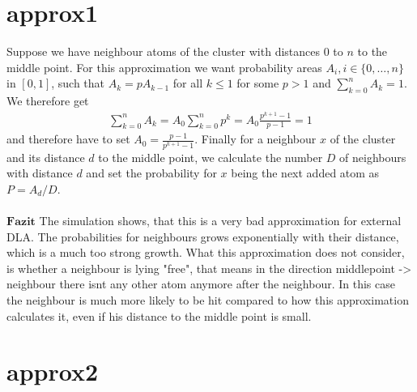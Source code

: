 \documentclass[12pt,a4paper]{scrartcl}
\begin{document}
	\pagestyle{empty}
	\theoremstyle{definition}
	\newtheorem{exmp}{Example}[section]
	\newtheorem{theorem}{Theorem}[section]
	\newtheorem{corollary}{Corollary}[theorem]
	\newtheorem{lemma}[theorem]{Lemma}
	\newtheorem{definition}[theorem]{Definition} 
	\newtheorem{proposition}[theorem]{Proposition}

\section{approx1}
Suppose we have neighbour atoms of the cluster with distances $0$ to $n$ to the middle point. For this approximation we want probability areas $A_i,i\in \{0,\dots,n\}$ in $[0,1]$, such that $A_k = pA_{k-1}$ for all $k\leq 1$ for some $p>1$ and $\sum_{k=0}^n A_k = 1$. We therefore get 
\begin{align*}
	\sum_{k=0}^n A_k = A_0\sum_{k=0}^n p^k = A_0 \frac{p^{k+1} - 1}{p - 1} = 1
\end{align*}
and therefore have to set $A_0 = \frac{p-1}{p^{k+1}-1}$. Finally for a neighbour $x$ of the cluster and its distance $d$ to the middle point, we calculate the number $D$ of neighbours with distance $d$ and set the probability for $x$ being the next added atom as $P=A_d / D$. \\
\\
$\boldsymbol{Fazit}$ The simulation shows, that this is a very bad approximation for external DLA. The probabilities for neighbours grows exponentially with their distance, which is a much too strong growth. What this approximation does not consider, is whether a neighbour is lying "free", that means in the direction middlepoint -> neighbour there isnt any other atom anymore after the neighbour. In this case the neighbour is much more likely to be hit compared to how this approximation calculates it, even if his distance to the middle point is small. 

\section{approx2}






	
\end{document}
